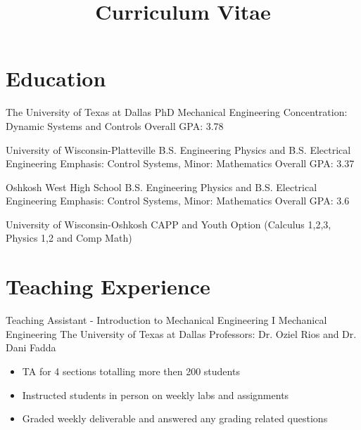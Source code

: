 \documentclass[11pt,letterpaper,roman]{moderncv} %
\title{Curriculum Vitae}
\begin{document}

\makecvtitle %

\vspace{- 0.5 cm}

\section{Education}

{The University of Texas at Dallas}
{PhD Mechanical Engineering}{}
{Concentration: Dynamic Systems and Controls} 
{Overall GPA: 3.78}

{University of Wisconsin-Platteville}
{B.S. Engineering Physics and  B.S. Electrical Engineering}{}
{Emphasis: Control Systems, Minor: Mathematics} 
{Overall GPA: 3.37}

{Oshkosh West High School}
{B.S. Engineering Physics and  B.S. Electrical Engineering}{}
{Emphasis: Control Systems, Minor: Mathematics} 
{Overall GPA: 3.6}

{University of Wisconsin-Oshkosh}
{CAPP and Youth Option}
{(Calculus 1,2,3, Physics 1,2 and Comp Math)}{}{}


\section{Teaching Experience}

{Teaching Assistant - Introduction to Mechanical Engineering I}
{Mechanical Engineering}
{The University of Texas at Dallas}
{Professors: Dr. Oziel Rios and Dr. Dani Fadda}
{\begin{itemize}
    \item TA for 4 sections totalling more then 200 students
    \item Instructed students in person on weekly labs and assignments
    \item Graded weekly deliverable and answered any grading related questions
\end{itemize}}
\end{document}
